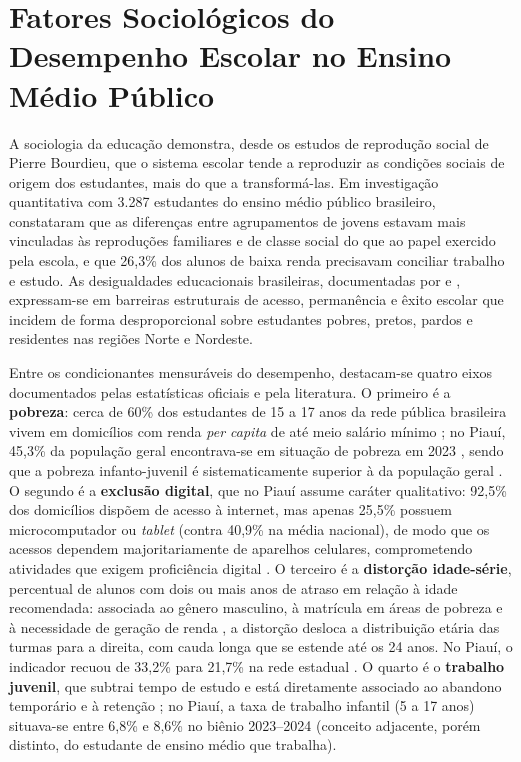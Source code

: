 \section{Fatores Sociológicos do Desempenho Escolar no Ensino Médio Público}

A sociologia da educação demonstra, desde os estudos de reprodução social de Pierre Bourdieu, que o sistema escolar tende a reproduzir as condições sociais de origem dos estudantes, mais do que a transformá-las. Em investigação quantitativa com 3.287 estudantes do ensino médio público brasileiro,  constataram que as diferenças entre agrupamentos de jovens estavam mais vinculadas às reproduções familiares e de classe social do que ao papel exercido pela escola, e que 26,3\% dos alunos de baixa renda precisavam conciliar trabalho e estudo. As desigualdades educacionais brasileiras, documentadas por  e , expressam-se em barreiras estruturais de acesso, permanência e êxito escolar que incidem de forma desproporcional sobre estudantes pobres, pretos, pardos e residentes nas regiões Norte e Nordeste.

Entre os condicionantes mensuráveis do desempenho, destacam-se quatro eixos documentados pelas estatísticas oficiais e pela literatura. O primeiro é a \textbf{pobreza}: cerca de 60\% dos estudantes de 15 a 17 anos da rede pública brasileira vivem em domicílios com renda \textit{per capita} de até meio salário mínimo \cite{fadc2023}; no Piauí, 45,3\% da população geral encontrava-se em situação de pobreza em 2023 \cite{ibgesis2024}, sendo que a pobreza infanto-juvenil é sistematicamente superior à da população geral \cite{fadc2023}. O segundo é a \textbf{exclusão digital}, que no Piauí assume caráter qualitativo: 92,5\% dos domicílios dispõem de acesso à internet, mas apenas 25,5\% possuem microcomputador ou \textit{tablet} (contra 40,9\% na média nacional), de modo que os acessos dependem majoritariamente de aparelhos celulares, comprometendo atividades que exigem proficiência digital \cite{ibgesidra2025tic, ibge2024tic}. O terceiro é a \textbf{distorção idade-série}, percentual de alunos com dois ou mais anos de atraso em relação à idade recomendada: associada ao gênero masculino, à matrícula em áreas de pobreza e à necessidade de geração de renda \cite{lima2013, chiapinoto2024}, a distorção desloca a distribuição etária das turmas para a direita, com cauda longa que se estende até os 24 anos. No Piauí, o indicador recuou de 33,2\% para 21,7\% na rede estadual \cite{inep2025, todospelaeducacaopiaui}. O quarto é o \textbf{trabalho juvenil}, que subtrai tempo de estudo e está diretamente associado ao abandono temporário e à retenção \cite{berlato2020, campos2024}; no Piauí, a taxa de trabalho infantil (5 a 17 anos) situava-se entre 6,8\% e 8,6\% no biênio 2023--2024 \cite{mte2024trabalho} (conceito adjacente, porém distinto, do estudante de ensino médio que trabalha).

